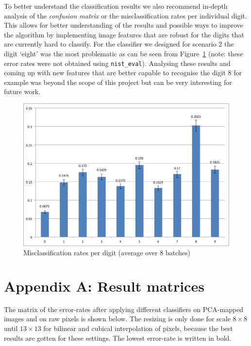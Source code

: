 \documentclass{article}
\begin{document}
To better understand the classification results we also recommend in-depth analysis of the \emph{confusion matrix} or the misclassification rates per individual digit. This allows for better understanding of the results and possible ways to improve the algorithm by implementing image features that are robust for the digits that are currently hard to classify. For the classifier we designed for scenario 2 the digit `eight' was the most problematic as can be seen from Figure~\ref{fig:digit-misclassification} (note: these error rates were not obtained using \texttt{nist\_eval}). Analysing these results and coming up with new features that are better capable to recognise the digit $8$ for example was beyond the scope of this project but can be very interesting for future work.

\begin{figure}[H]
    \center
    \includegraphics[width=.7\textwidth]{misclassification-digits}
    \caption{Misclassification rates per digit (average over $8$ batches) \label{fig:digit-misclassification}}
\end{figure}

\clearpage

\section{Appendix A: Result matrices}

The matrix of the error-rates after applying different classifiers on PCA-mapped images and on raw pixels is shown below. The resizing is only done for scale $8 \times 8$ until $13 \times 13$ for bilinear and cubical interpolation of pixels, because the best results are gotten for these settings. The lowest error-rate is written in bold.
\end{document}
